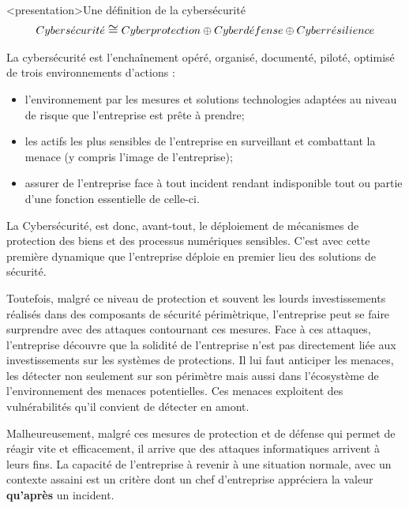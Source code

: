 \begin{frame}<presentation>{Une définition de la cybersécurité}
\begin{align}
{\large
Cybers\acute{e}curit\acute{e} \cong Cyberprotection\oplus Cyberd\acute{e}fense \oplus Cyberr\acute{e}silience
        }
\end{align}
\end{frame}

\begin{frame}

La cybersécurité est l'enchaînement opéré, organisé, documenté, piloté, optimisé de trois environnements d'actions :
\begin{itemize}
 \item {} l'environnement par les mesures et solutions technologies adaptées au niveau de risque que l'entreprise est prête à prendre; 
 \item {} les actifs les plus sensibles de l'entreprise en surveillant et combattant la menace (y compris l'image de l'entreprise);
 \item assurer  de l'entreprise face à tout incident rendant indisponible tout ou partie d'une fonction essentielle de celle-ci.
\end{itemize}

\end{frame}

La Cybersécurité, est donc, avant-tout, le déploiement de mécanismes de protection des biens et des processus numériques sensibles. C’est avec cette première dynamique que l’entreprise déploie en premier lieu des solutions de sécurité. 

Toutefois, malgré ce niveau de protection et souvent les lourds investissements réalisés dans des composants de sécurité périmètrique, l’entreprise peut se faire surprendre avec des attaques contournant ces mesures. Face à ces attaques, l’entreprise découvre que la solidité de l’entreprise n’est pas directement liée aux investissements sur les systèmes de protections. Il lui faut anticiper les menaces, les détecter non seulement sur son périmètre mais aussi dans l’écosystème de l’environnement des menaces potentielles. Ces menaces exploitent des vulnérabilités qu’il convient de détecter en amont.

Malheureusement, malgré ces mesures de protection et de défense qui permet de réagir vite et efficacement, il arrive que des attaques informatiques arrivent à leurs fins. La capacité de l’entreprise à revenir à une situation normale, avec un contexte assaini est un critère dont un chef d’entreprise appréciera la valeur \textbf{qu’après} un incident.

